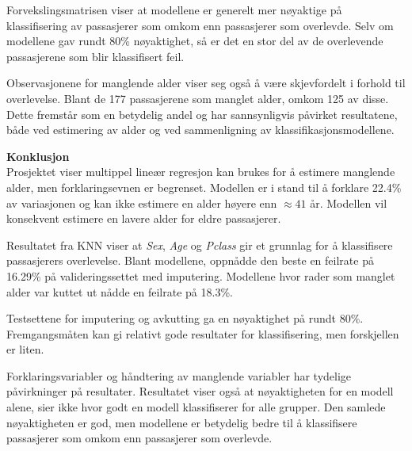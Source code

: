 Forvekslingsmatrisen viser at modellene er generelt mer nøyaktige på klassifisering av passasjerer som omkom enn passasjerer som overlevde. Selv om modellene gav rundt 80\% nøyaktighet, så er det en stor del av de overlevende passasjerene som blir klassifisert feil.

Observasjonene for manglende alder viser seg også å være skjevfordelt i forhold til overlevelse. Blant de 177 passasjerene som manglet alder, omkom 125 av disse. Dette fremstår som en betydelig andel og har sannsynligvis påvirket resultatene, både ved estimering av alder og ved sammenligning av klassifikasjonsmodellene.

\textbf{Konklusjon} \\
Prosjektet viser multippel lineær regresjon kan brukes for å estimere manglende alder, men forklaringsevnen er begrenset. Modellen er i stand til å forklare 22.4\% av variasjonen og kan ikke estimere en alder høyere enn $\approx 41$ år. Modellen vil konsekvent estimere en lavere alder for eldre passasjerer.

Resultatet fra KNN viser  at \textit{Sex}, \textit{Age} og \textit{Pclass} gir et grunnlag for å klassifisere passasjerers overlevelse. Blant modellene, oppnådde den beste en feilrate på 16.29\% på valideringssettet med imputering. Modellene hvor rader som manglet alder var kuttet ut nådde en feilrate på 18.3\%.

Testsettene for imputering og avkutting ga en nøyaktighet på rundt 80\%. Fremgangsmåten kan gi relativt gode resultater for klassifisering, men forskjellen er liten.

Forklaringsvariabler og håndtering av manglende variabler har tydelige påvirkninger på resultater. Resultatet viser også at nøyaktigheten for en modell alene, sier ikke hvor godt en modell klassifiserer for alle grupper. Den samlede nøyaktigheten er god, men modellene er betydelig bedre til å klassifisere passasjerer som omkom enn passasjerer som overlevde.


